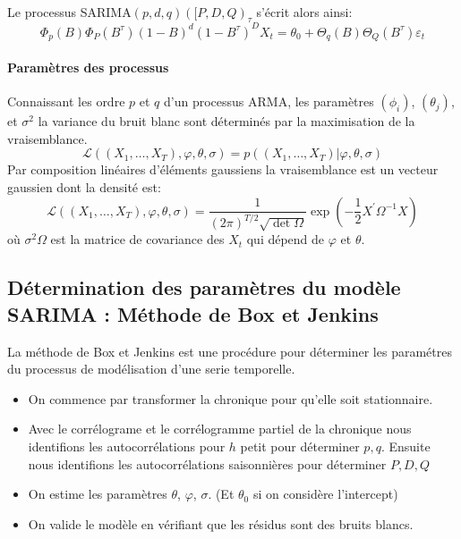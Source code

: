 \documentclass{article}
\theoremstyle{definition}
\theoremstyle{remark}
\begin{document}
\paragraph{}
Le processus SARIMA$(p,d,q)([P,D,Q)_{\tau}$ s'écrit alors ainsi:
\begin{equation}
	\Phi_{p}(B) \Phi_{P}\left(B^{\tau}\right)(1-B)^{d}\left(1-B^{\tau}\right)^{D} X_{t}=\theta_{0}+\Theta_{q}(B) \Theta_{Q}\left(B^{\tau}\right) \varepsilon_{t}
	\end{equation}


\paragraph{Paramètres des processus \\}
Connaissant les ordre $p$ et $q$ d'un processus ARMA, les paramètres $(\phi_i)$, $(\theta_j)$, et $\sigma^2$ la variance du bruit blanc 
sont déterminés par la maximisation de la vraisemblance.
\begin{equation}
	\mathcal{L}\left((X_1, \ldots, X_{T}) , \varphi , \theta, \sigma\right)
	= p((X_1, \ldots, X_{T}) | \varphi , \theta, \sigma)
\end{equation}
Par composition linéaires d'éléments gaussiens la vraisemblance est un vecteur gaussien dont la densité est:
\begin{equation}
	\mathcal{L}\left((X_1, \ldots, X_{T}) , \varphi , \theta, \sigma\right)=\frac{1}{(2 \pi)^{T / 2} \sqrt{\operatorname{det} \Omega}} \exp \left(-\frac{1}{2} X^{\prime} \Omega^{-1} X\right)
	\end{equation}
où $\sigma^2 \Omega$ est la matrice de covariance des $X_t$ qui dépend de $\varphi$ et $\theta$.

\subsection{Détermination des paramètres du modèle SARIMA : Méthode de Box et Jenkins}
La méthode de Box et Jenkins est une procédure pour déterminer les paramétres du processus de modélisation d'une serie temporelle.
\begin{itemize}
\item On commence par transformer la chronique pour qu'elle soit stationnaire.
\item Avec le corrélograme et le corrélogramme partiel de la chronique nous identifions les autocorrélations pour $h$ petit 
pour déterminer $p,q$. Ensuite nous identifions les autocorrélations saisonnières pour déterminer $P,D,Q$
\item On estime les paramètres $\theta$, $\varphi$, $\sigma$. (Et $\theta_0$ si on considère l'intercept) 
\item On valide le modèle en vérifiant que les résidus sont des bruits blancs.
\end{itemize}
\end{document}
